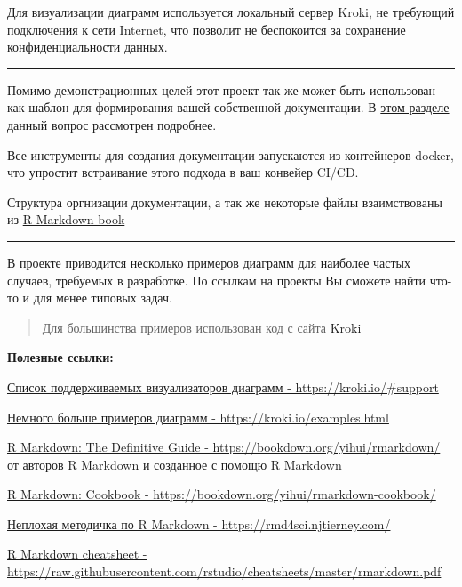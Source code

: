 \documentclass[12pt,a4paper,12pt,oneside,openany]{book}
\begin{document}
Для визуализации диаграмм используется локальный сервер Kroki, не требующий подключения к сети Internet, что позволит не беспокоится за сохранение конфиденциальности данных.

\begin{center}\rule{0.5\linewidth}{\linethickness}\end{center}

Помимо демонстрационных целей этот проект так же может быть использован как шаблон для формирования вашей собственной документации. В \protect\hyperlink{as_template}{этом разделе} данный вопрос рассмотрен подробнее.

Все инструменты для создания документации запускаются из контейнеров docker, что упростит встраивание этого подхода в ваш конвейер CI/CD.

Структура оргнизации документации, а так же некоторые файлы взаимствованы из \href{https://github.com/rstudio/rmarkdown-book}{R Markdown book}

\begin{center}\rule{0.5\linewidth}{\linethickness}\end{center}

В проекте приводится несколько примеров диаграмм для наиболее частых случаев, требуемых в разработке. По ссылкам на проекты Вы сможете найти что-то и для менее типовых задач.

\begin{quote}
Для большинства примеров использован код с сайта \href{https://kroki.io/examples.html}{Kroki}
\end{quote}

\textbf{Полезные ссылки:}

\href{https://kroki.io/\#support}{Список поддерживаемых визуализаторов диаграмм - https://kroki.io/\#support}

\href{https://kroki.io/examples.html}{Немного больше примеров диаграмм - https://kroki.io/examples.html}

\href{https://bookdown.org/yihui/rmarkdown/}{R Markdown: The Definitive Guide - https://bookdown.org/yihui/rmarkdown/}\\
от авторов R Markdown и созданное с помощю R Markdown

\href{https://bookdown.org/yihui/rmarkdown-cookbook/}{R Markdown: Cookbook - https://bookdown.org/yihui/rmarkdown-cookbook/}

\href{https://rmd4sci.njtierney.com/}{Неплохая методичка по R Markdown - https://rmd4sci.njtierney.com/}

\href{https://raw.githubusercontent.com/rstudio/cheatsheets/master/rmarkdown.pdf}{R Markdown cheatsheet - https://raw.githubusercontent.com/rstudio/cheatsheets/master/rmarkdown.pdf}
\end{document}
